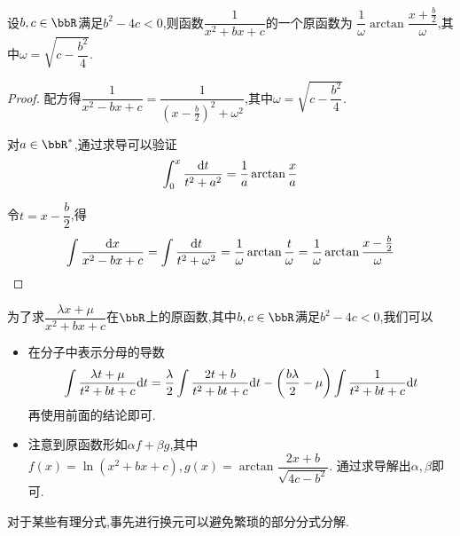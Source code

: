 \begin{prop}
    设$b, c \in \bbR$满足$b^2 - 4c < 0$,则函数$\dfrac{1}{x^2 + bx + c}$的一个原函数为
    $\dfrac{1}{\omega} \arctan \dfrac{x + \frac{b}{2}}{\omega}$,其中$\omega = \sqrt{c - \dfrac{b^2}{4}}$.
\end{prop}

\begin{proof}
    配方得$\dfrac{1}{x^2 - bx + c} = \dfrac{1}{(x - \frac{b}{2})^2 + \omega^2}$,其中$\omega = \sqrt{c - \dfrac{b^2}{4}}$.

    对$a \in \bbR^*$,通过求导可以验证\[ \int_0^x \dfrac{\mathrm{d} t}{t^2 + a^2} = \dfrac{1}{a} \arctan \dfrac{x}{a} \]

    令$t = x - \dfrac{b}{2}$,得\[ \int \dfrac{\mathrm{d} x}{x^2 - bx + c} = \int \dfrac{\mathrm{d} t}{t^2 + \omega^2} =
    \dfrac{1}{\omega} \arctan \dfrac{t}{\omega} = \dfrac{1}{\omega} \arctan \dfrac{x - \frac{b}{2}}{\omega} \qedhere \]
\end{proof}

\begin{rqq}
    为了求$\dfrac{\lambda x + \mu}{x^2 + bx + c}$在$\bbR$上的原函数,其中$b, c \in \bbR$满足$b^2 - 4c < 0$,我们可以

    \begin{itemize}
        \item 在分子中表示分母的导数$$\int \dfrac{\lambda t + \mu}{t^2 + bt + c} \mathrm{d} t =
            \dfrac{\lambda}{2} \int \dfrac{2t + b}{t^2 + bt + c} \mathrm{d} t -
            \left( \dfrac{b \lambda}{2} - \mu \right) \int \dfrac{1}{t^2 + bt + c} \mathrm{d} t$$
            再使用前面的结论即可.
        \item 注意到原函数形如$\alpha f + \beta g$,其中$f(x) = \ln (x^2 + bx + c), g(x) = \arctan \dfrac{2x + b}{\sqrt{4c - b^2}}$.
            通过求导解出$\alpha, \beta$即可.
    \end{itemize}
\end{rqq}

\begin{rqq}
    对于某些有理分式,事先进行换元可以避免繁琐的部分分式分解.
\end{rqq}

